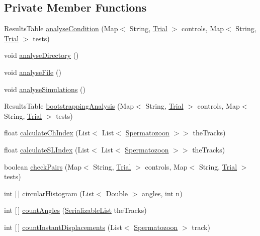 \subsection*{Private Member Functions}
\begin{DoxyCompactItemize}
\item 
Results\+Table \hyperlink{classanalysis_1_1_chemotaxis_aaa89eb018d311df9e98b904088d282a5}{analyse\+Condition} (Map$<$ String, \hyperlink{classdata_1_1_trial}{Trial} $>$ controls, Map$<$ String, \hyperlink{classdata_1_1_trial}{Trial} $>$ tests)
\item 
void \hyperlink{classanalysis_1_1_chemotaxis_ad8447fb7554f7f126822c7a3f3f680ce}{analyse\+Directory} ()
\item 
void \hyperlink{classanalysis_1_1_chemotaxis_a0b1464e818c4300782cb7e3322448f95}{analyse\+File} ()
\item 
void \hyperlink{classanalysis_1_1_chemotaxis_ad992aa584aa410ee10b0b5df660c43ec}{analyse\+Simulations} ()
\item 
Results\+Table \hyperlink{classanalysis_1_1_chemotaxis_a381aa5dd2dd75a72b6b21f7b2475d888}{bootstrapping\+Analysis} (Map$<$ String, \hyperlink{classdata_1_1_trial}{Trial} $>$ controls, Map$<$ String, \hyperlink{classdata_1_1_trial}{Trial} $>$ tests)
\item 
float \hyperlink{classanalysis_1_1_chemotaxis_a4ab493d2d901c65e8387095a69cbf83d}{calculate\+Ch\+Index} (List$<$ List$<$ \hyperlink{classdata_1_1_spermatozoon}{Spermatozoon} $>$$>$ the\+Tracks)
\item 
float \hyperlink{classanalysis_1_1_chemotaxis_ae3ff70acea28007b345ce335321b82fe}{calculate\+S\+L\+Index} (List$<$ List$<$ \hyperlink{classdata_1_1_spermatozoon}{Spermatozoon} $>$$>$ the\+Tracks)
\item 
boolean \hyperlink{classanalysis_1_1_chemotaxis_a1ebc6d4aaad3ec1c0eca87acb729ffb5}{check\+Pairs} (Map$<$ String, \hyperlink{classdata_1_1_trial}{Trial} $>$ controls, Map$<$ String, \hyperlink{classdata_1_1_trial}{Trial} $>$ tests)
\item 
int \mbox{[}$\,$\mbox{]} \hyperlink{classanalysis_1_1_chemotaxis_a50fdf81a3460741674381622f16581cb}{circular\+Histogram} (List$<$ Double $>$ angles, int n)
\item 
int \mbox{[}$\,$\mbox{]} \hyperlink{classanalysis_1_1_chemotaxis_a55deae924cf7ec2004a8fdcd8e185f94}{count\+Angles} (\hyperlink{classdata_1_1_serializable_list}{Serializable\+List} the\+Tracks)
\item 
int \mbox{[}$\,$\mbox{]} \hyperlink{classanalysis_1_1_chemotaxis_a668ad1c1240012d6fb70c1fac4a219be}{count\+Instant\+Displacements} (List$<$ \hyperlink{classdata_1_1_spermatozoon}{Spermatozoon} $>$ track)

\end{DoxyCompactItemize}
